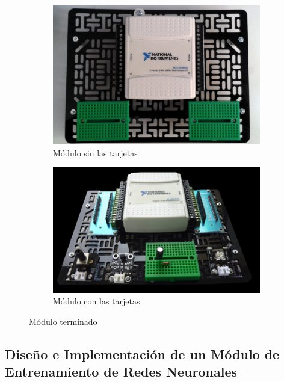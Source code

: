 \begin{figure}[h!]
  \centering
  \begin{subfigure}{0.4\textwidth}
    \centering
    \includegraphics[width=1.2\textwidth]{images/activities/daq/daq3.jpg}
    \caption{Módulo sin las tarjetas}
    \label{fig:modulo-daq-1}
  \end{subfigure}
  \hfill
  \begin{subfigure}{0.4\textwidth}
    \centering
    \includegraphics[width=1.2\textwidth]{images/activities/daq/daq4.png}
    \caption{Módulo con las tarjetas}
    \label{fig:modulo-daq-2}
  \end{subfigure}
  \caption{Módulo terminado}
  \label{fig:modulo-daq}
\end{figure}

\clearpage

\subsection{Diseño e Implementación de un Módulo de Entrenamiento de Redes Neuronales}

